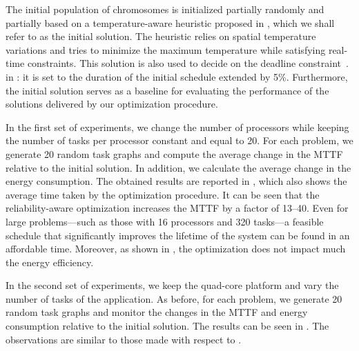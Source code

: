 The initial population of chromosomes is initialized partially randomly and
partially based on a temperature-aware heuristic proposed in \cite{xie2006},
which we shall refer to as the initial solution. The heuristic relies on spatial
temperature variations and tries to minimize the maximum temperature while
satisfying real-time constraints. This solution is also used to decide on the
deadline constraint $\period$ in : it is set
to the duration of the initial schedule extended by 5\%. Furthermore, the
initial solution serves as a baseline for evaluating the performance of the
solutions delivered by our optimization procedure.

In the first set of experiments, we change the number of processors \np while
keeping the number of tasks \nt per processor constant and equal to 20. For each
problem, we generate 20 random task graphs and compute the average change in the
\ac{MTTF} relative to the initial solution. In addition, we calculate the
average change in the energy consumption. The obtained results are reported in
, which also shows the average time taken by
the optimization procedure. It can be seen that the reliability-aware
optimization increases the \ac{MTTF} by a factor of 13--40. Even for large
problems---such as those with 16 processors and 320 tasks---a feasible schedule
that significantly improves the lifetime of the system can be found in an
affordable time. Moreover, as shown in , the
optimization does not impact much the energy efficiency.

In the second set of experiments, we keep the quad-core platform and vary the
number of tasks \nt of the application. As before, for each problem, we generate
20 random task graphs and monitor the changes in the \ac{MTTF} and energy
consumption relative to the initial solution. The results can be seen in
. The observations are similar to those made with
respect to .

